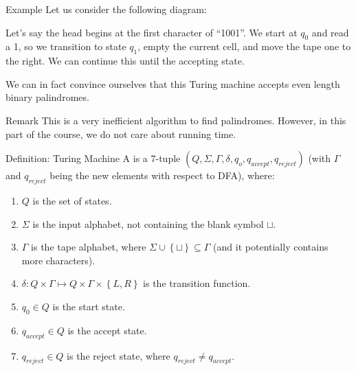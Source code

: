 \documentclass[a4paper]{article}
\begin{document}
\begin{parag}{Example}
    Let us consider the following diagram:

    Let's say the head begins at the first character of ``1001''. We start at $q_0$ and read a 1, so we transition to state $q_1$, empty the current cell, and move the tape one to the right. We can continue this until the accepting state. 

    We can in fact convince ourselves that this Turing machine accepts even length binary palindromes.

    \begin{subparag}{Remark}
        This is a very inefficient algorithm to find palindromes. However, in this part of the course, we do not care about running time.
    \end{subparag}
\end{parag}

\begin{parag}{Definition: Turing Machine}
    A  is a 7-tuple $\left(Q, \Sigma, \Gamma, \delta, q_o, q_{accept}, q_{reject}\right)$ (with $\Gamma$ and $q_{reject}$ being the new elements with respect to DFA), where:
    \begin{enumerate}
        \item $Q$ is the set of states.
        \item $\Sigma$ is the input alphabet, not containing the blank symbol $\sqcup$.
        \item $\Gamma$ is the tape alphabet, where $\Sigma \cup \left\{\sqcup\right\} \subseteq \Gamma$ (and it potentially contains more characters).
        \item $\delta: Q \times \Gamma \mapsto Q \times \Gamma \times \left\{L, R\right\}$ is the transition function.
        \item $q_0 \in Q$ is the start state.
        \item $q_{accept} \in Q$ is the accept state.
        \item $q_{reject} \in Q$ is the reject state, where $q_{reject} \neq q_{accept}$.
    \end{enumerate}
\end{parag}
\end{document}
